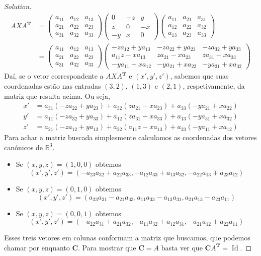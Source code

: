 \begin{proof}[Solution]
\begin{align*}AXA^{\mathbf{T}}&=\begin{pmatrix}a_{11}&a_{12}&a_{13}\\ a_{21}&a_{22}&a_{23}\\ a_{31}&a_{32}&a_{33}\end{pmatrix}\begin{pmatrix}0&-z&y\\ z&0&-x\\ -y&x&0\end{pmatrix}\begin{pmatrix}a_{11}&a_{21}&a_{31}\\ a_{12}&a_{22}&a_{32}\\ a_{13}&a_{23}&a_{33}\end{pmatrix}\\
&=\begin{pmatrix}a_{11}&a_{12}&a_{13}\\ a_{21}&a_{22}&a_{23}\\ a_{31}&a_{32}&a_{33}\end{pmatrix}\begin{pmatrix}-za_{12}+ya_{13}&-za_{22}+ya_{23}&-za_{32}+ya_{33}\\ a_{11}z-xa_{13}&za_{21}-xa_{23}&za_{31}-xa_{33}\\ -ya_{11}+xa_{12}&-ya_{21}+xa_{22}&-ya_{31}+xa_{32}\end{pmatrix}\end{align*}
Daí, se o vetor correspondente a $AXA^{\mathbf{T}}$ e $(x',y',z')$, sabemos que suas coordenadas estão nas entradas $(3,2)$, $(1,3)$ e $(2,1)$, respetivamente, da matriz que resulta acima. Ou seja,
\begin{align*}
	x'&=a_{31}(-za_{22}+ya_{23})+a_{32}(za_{21}-xa_{23})+a_{33}(-ya_{21}+xa_{22})\\
	y'&=a_{11}(-za_{32}+ya_{33})+a_{12}(za_{31}-xa_{33})+a_{13}(-ya_{31}+xa_{32})\\
	z'&=a_{21}(-za_{12}+ya_{13})+a_{22}(a_{11}z-xa_{13})+a_{23}(-ya_{11}+xa_{12})
\end{align*}
Para achar a matriz buscada simplesmente calculamos as coordenadas dos vetores canónicos de $\mathbb{R}^{3}$.

\begin{itemize}
\item Se $(x,y,z)=(1,0,0)$ obtemos  \[(x',y',z')=(-a_{23}a_{32}+a_{22}a_{33},-a_{12}a_{33}+a_{13}a_{32},-a_{22}a_{13}+a_{23}a_{12})\]
\item Se $(x,y,z)=(0,1,0)$ obtemos  \[(x',y',z')=(a_{23}a_{31}-a_{21}a_{33},a_{11}a_{33}-a_{13}a_{31},a_{21}a_{13}-a_{23}a_{11})\]
\item Se $(x,y,z)=(0,0,1)$ obtemos  \[(x',y',z')=(-a_{22}a_{31}+a_{21}a_{32},-a_{11}a_{32}+a_{12}a_{31},-a_{21}a_{12}+a_{22}a_{11})\]
\end{itemize}
Esses treis vetores em colunas conformam a matriz que buscamos, que podemos chamar por enquanto $\mathbf{C}$. Para mostrar que $\mathbf{C}=A$ basta ver que $\mathbf{C}A^{\mathbf{T}}=\operatorname{Id}$.


\end{proof}
